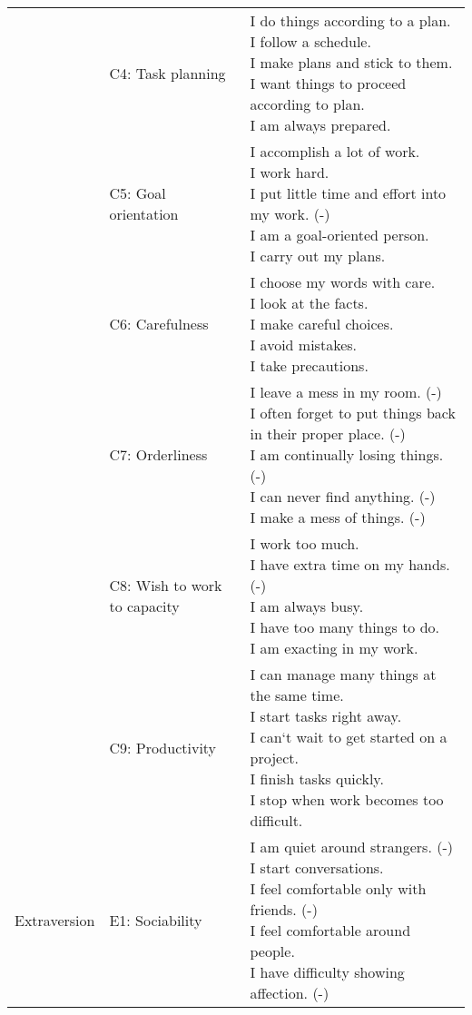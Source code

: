 \begin{appendix}
\begin{longtable}[t]{lll}
\addlinespace
 & C4: Task planning & \makecell[l]{I do things according to a plan.\\I follow a schedule.\\I make plans and stick to them.\\I want things to proceed according to plan.\\I am always prepared.}\\
\addlinespace
 & C5: Goal orientation & \makecell[l]{I accomplish a lot of work.\\I work hard.\\I put little time and effort into my work. (-)\\I am a goal-oriented person.\\I carry out my plans.}\\
\addlinespace
 & C6: Carefulness & \makecell[l]{I choose my words with care.\\I look at the facts.\\I make careful choices.\\I avoid mistakes.\\I take precautions.}\\
\addlinespace
 & C7: Orderliness & \makecell[l]{I leave a mess in my room. (-)\\I often forget to put things back in their proper place. (-)\\I am continually losing things. (-)\\I can never find anything. (-)\\I make a mess of things. (-)}\\
\addlinespace
 & C8: Wish to work to capacity & \makecell[l]{I work too much.\\I have extra time on my hands. (-)\\I am always busy.\\I have too many things to do.\\I am exacting in my work.}\\
\addlinespace
 & C9: Productivity & \makecell[l]{I can manage many things at the same time.\\I start tasks right away.\\I can`t wait to get started on a project.\\I finish tasks quickly.\\I stop when work becomes too difficult.}\\
\addlinespace
Extraversion & E1: Sociability & \makecell[l]{I am quiet around strangers. (-)\\I start conversations.\\I feel comfortable only with friends. (-)\\I feel comfortable around people.\\I have difficulty showing affection. (-)}\\

\end{longtable}
\end{appendix}
